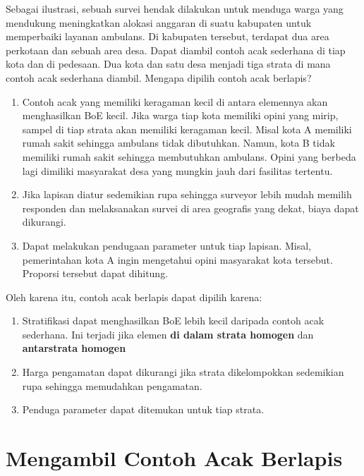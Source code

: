 \documentclass[
  letterpaper,
  DIV=11,
  numbers=noendperiod]{scrreprt}
\providecommand{\tightlist}{%
  \setlength{\itemsep}{0pt}\setlength{\parskip}{0pt}}\usepackage{longtable,booktabs,array}
\begin{document}
Sebagai ilustrasi, sebuah survei hendak dilakukan untuk menduga warga
yang mendukung meningkatkan alokasi anggaran di suatu kabupaten untuk
memperbaiki layanan ambulans. Di kabupaten tersebut, terdapat dua area
perkotaan dan sebuah area desa. Dapat diambil contoh acak sederhana di
tiap kota dan di pedesaan. Dua kota dan satu desa menjadi tiga strata di
mana contoh acak sederhana diambil. Mengapa dipilih contoh acak
berlapis?

\begin{enumerate}
\def\labelenumi{\arabic{enumi}.}
\tightlist
\item
  Contoh acak yang memiliki keragaman kecil di antara elemennya akan
  menghasilkan BoE kecil. Jika warga tiap kota memiliki opini yang
  mirip, sampel di tiap strata akan memiliki keragaman kecil. Misal kota
  A memiliki rumah sakit sehingga ambulans tidak dibutuhkan. Namun, kota
  B tidak memiliki rumah sakit sehingga membutuhkan ambulans. Opini yang
  berbeda lagi dimiliki masyarakat desa yang mungkin jauh dari fasilitas
  tertentu.
\item
  Jika lapisan diatur sedemikian rupa sehingga surveyor lebih mudah
  memilih responden dan melaksanakan survei di area geografis yang
  dekat, biaya dapat dikurangi.
\item
  Dapat melakukan pendugaan parameter untuk tiap lapisan. Misal,
  pemerintahan kota A ingin mengetahui opini masyarakat kota tersebut.
  Proporsi tersebut dapat dihitung.
\end{enumerate}

Oleh karena itu, contoh acak berlapis dapat dipilih karena:

\begin{enumerate}
\def\labelenumi{\arabic{enumi}.}
\tightlist
\item
  Stratifikasi dapat menghasilkan BoE lebih kecil daripada contoh acak
  sederhana. Ini terjadi jika elemen \textbf{di dalam strata homogen}
  dan \textbf{antarstrata homogen}
\item
  Harga pengamatan dapat dikurangi jika strata dikelompokkan sedemikian
  rupa sehingga memudahkan pengamatan.
\item
  Penduga parameter dapat ditemukan untuk tiap strata.
\end{enumerate}

\hypertarget{mengambil-contoh-acak-berlapis}{%
\section{Mengambil Contoh Acak
Berlapis}\label{mengambil-contoh-acak-berlapis}}
\end{document}
